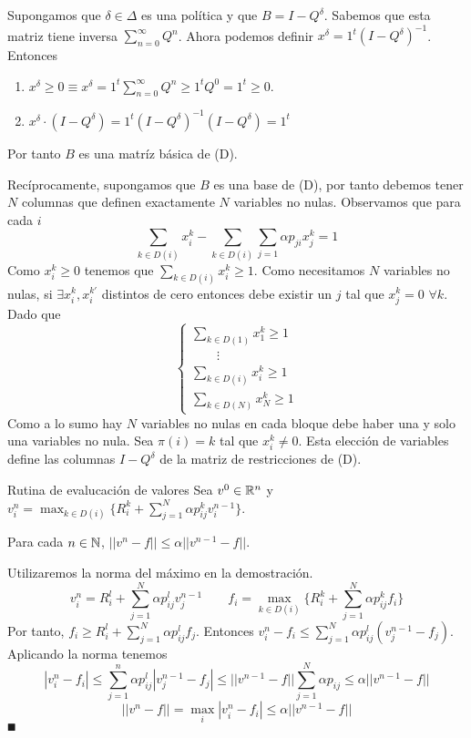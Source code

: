 \documentclass[MIOP.tex]{subfiles}
\begin{document}
\begin{dem}
Supongamos que $\delta \in \Delta$ es una política y que $B= I-Q^\delta$. Sabemos que esta matriz tiene inversa $\sum_{n=0}^\infty Q^n$. Ahora podemos definir $x^\delta = 1^t(I-Q^\delta)^{-1}$. Entonces
\begin{enumerate}
\item $x^\delta \geq0 \equiv x^\delta = 1^t \sum_{n=0}^\infty Q^n \geq 1^t Q^0 = 1^t \geq 0$.
\item $x^\delta \cdot (I-Q^\delta) = 1^t (I-Q^\delta)^{-1}(I-Q^\delta) = 1^t$
\end{enumerate}
Por tanto $B$ es una matríz básica de (D).

Recíprocamente, supongamos que $B$ es una base de (D), por tanto debemos tener $N$ columnas que definen exactamente $N$ variables no nulas. Observamos que para cada $i$
$$
\sum_{k\in D(i)}x^k_i - \sum_{k\in D(i)}\sum_{j=1} \alpha p_{ji} x_j^k = 1
$$
Como $x_i^k\geq 0$ tenemos que $\sum_{k\in D(i)}x_i^k \geq 1$. Como necesitamos $N$ variables no nulas, si $\exists x_i^k, x_i^{k'}$ distintos de cero entonces debe existir un $j$ tal que $x_j^k = 0$ $\forall k$. Dado que
$$
\begin{cases}
\sum_{k\in D(1)} x_1^k \geq 1\\
\qquad\vdots\\
\sum_{k\in D(i)} x_i^k \geq 1\\
\sum_{k\in D(N)} x_N^k \geq 1
\end{cases}
$$
Como a lo sumo hay $N$ variables no nulas en cada bloque debe haber una y solo una variables no nula. Sea $\pi(i)=k$ tal que $x_i^k\neq0$. Esta elección de variables define las columnas $I-Q^\delta$ de la matriz de restricciones de (D). 
\end{dem}
Rutina de evalucación de valores
Sea $v^0\in \mathbb{R}^n$ y $v_i^n = \max_{k\in D(i)}  \{R_i^k + \sum_{j=1}^N \alpha p_{ij}^k v_i^{n-1}\}$.
\begin{teorema}
Para cada $n\in\mathbb{N}$, $||v^n-f||\leq \alpha||v^{n-1}-f||$.  
\end{teorema}
\begin{dem}
Utilizaremos la norma del máximo en la demostración. 
$$
v_i^n = R_i^l + \sum_{j=1}^N \alpha p_{ij}^l v_j^{n-1}
\qquad
f_i = \max_{k\in D(i)}  \{R_i^k + \sum_{j=1}^N \alpha p_{ij}^k f_i\}
$$
Por tanto, $f_i \geq R_i^l + \sum_{j=1}^N \alpha p_{ij}^l f_j$. Entonces $v_i^n-f_i \leq \sum_{j=1}^N \alpha p_{ij}^l(v_j^{n-1}-f_j)$. Aplicando la norma tenemos
$$
|v^n_i-f_i| \leq \sum_{j=1}^n \alpha p_{ij}^l |v_j^{n-1}-f_j| \leq ||v^{n-1}-f|| \sum_{j=1}^N \alpha p_{ij} \leq \alpha||v^{n-1}-f||$$
$$
||v^n-f|| = \max_i |v_i^n - f_i| \leq \alpha ||v^{n-1}-f||
$$
$\QED$
\end{dem}
\end{document}
